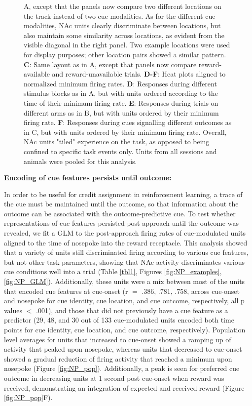 \documentclass[11pt]{article}
\newcommand{\bsf}[1]{\textbf{#1}}
\begin{document}
\begin{figure}[ht!]
{A, except that the panels now compare two different locations on the track
instead of two cue modalities. As for the different cue modalities, NAc units
clearly discriminate between locations, but also maintain some similarity
across locations, as evident from the visible diagonal in the right panel. Two
example locations were used for display purposes; other location pairs showed
a similar pattern. \bsf{C}: Same layout as in A, except that panels now
compare reward-available and reward-unavailable trials. \bsf{D-F}: Heat plots
aligned to normalized minimum firing rates. \bsf{D}: Responses during
different stimulus blocks as in A, but with units ordered according to the
time of their minimum firing rate. \bsf{E}: Responses during trials on
different arms as in B, but with units ordered by their minimum firing
rate. \bsf{F}: Responses during cues signalling different outcomes as in C,
but with units ordered by their minimum firing rate. Overall, NAc units
"tiled" experience on the task, as opposed to being confined to specific task
events only. Units from all sessions and animals were pooled for this
analysis.}
\label{fig:tiling}
\end{figure} \clearpage

{\bf Encoding of cue features persists until outcome:}

In order to be useful for credit assignment in reinforcement learning, a trace of the cue must be maintained until the outcome, so that information about the outcome can be associated with the outcome-predictive cue. To test whether representations of cue features persisted post-approach until the outcome was revealed, we fit a GLM to the post-approach firing rates of cue-modulated units aligned to the time of nosepoke into the reward receptacle. This analysis
showed that a variety of units still discriminated firing according to various cue features, but not other task parameters, showing that NAc activity discriminates various cue conditions well into a trial (Table \ref{tbl1}, Figures \ref{fig:NP_examples},\ref{fig:NP_GLM}). Additionally, these units were a mix between most of the units that encoded cue features at cue-onset (r $=$ .386, .781, .758, across cue-onset and nosepoke for cue identity, cue location, and cue outcome, respectively, all p values $<$ .001), and those that did not previously have a cue feature as a predictor (29, 48, and 30 out of 133 cue-modulated units encoded both time points for cue identity, cue location, and cue outcome, respectively). Population level averages for units that increased to cue-onset showed a ramping up of activity that peaked upon nosepoke, whereas units that decreased to cue-onset showed a gradual reduction of firing activity that reached a minimum upon nosepoke (Figure \ref{fig:NP_pop}). Additionally, a peak is seen for preferred cue outcome in decreasing units at 1 second post cue-onset when reward was received, demonstrating an integration of expected and received reward (Figure \ref{fig:NP_pop}F). 
\end{document}
